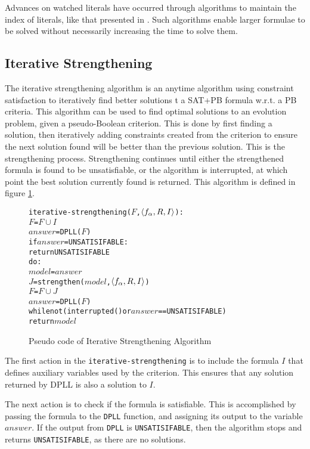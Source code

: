 Advances on watched literals have occurred through algorithms to maintain the index of literals, like that presented in \citep{Moskewicz2001}.
Such algorithms enable larger formulae to be solved without necessarily increasing the time to solve them.

\subsection{Iterative Strengthening}
The iterative strengthening algorithm  \citep{calistri1994iterative, le2010sat4j} 
is an anytime algorithm using constraint satisfaction to iteratively find better solutions t a SAT+PB formula w.r.t. a PB criteria.
This algorithm can be used to find optimal solutions to an evolution problem, given a pseudo-Boolean criterion.
This is done by first finding a solution, then iteratively adding constraints created from the criterion to ensure the next solution found will be better than the previous solution.
This is the strengthening process.
Strengthening continues until either the strengthened formula is found to be unsatisfiable, or the algorithm is interrupted, at which point the best solution currently found is returned. 
This algorithm is defined in figure \ref{impl.strength}.

\begin{figure}[htp]
\begin{center}
\begin{alltt}
iterative-strengthening(\(F\),\(\langle f\sb{\alpha}, R, I \rangle\)):
    \(F\) = \(F \cup I\)
    \(answer\) = DPLL(\(F\))
    if \(answer\) = UNSATISIFABLE:
        return UNSATISIFABLE
    do:
        \(model\) = \(answer\)
        \(J\) = strengthen(\(model\),\(\langle f\sb{\alpha}, R, I \rangle\))
        \(F\) = \(F \cup J\)
        \(answer\) = DPLL(\(F\))
    while not (interrupted() or  \(answer\) == UNSATISIFABLE)
    return \(model\) 
\end{alltt}
  \caption{Pseudo code of Iterative Strengthening Algorithm}
  \label{impl.strength}
\end{center}
\end{figure}

The first action in the \texttt{iterative-strengthening} is to include the formula $I$ that defines auxiliary variables used by the criterion.
This ensures that any solution returned by DPLL is also a solution to $I$.

The next action is to check if the formula is satisfiable.
This is accomplished by passing the formula to the \texttt{DPLL} function, and assigning its output to the variable $answer$.
If the output from \texttt{DPLL} is \texttt{UNSATISIFABLE}, then the algorithm stops and returns \texttt{UNSATISIFABLE}, as there are no solutions.

